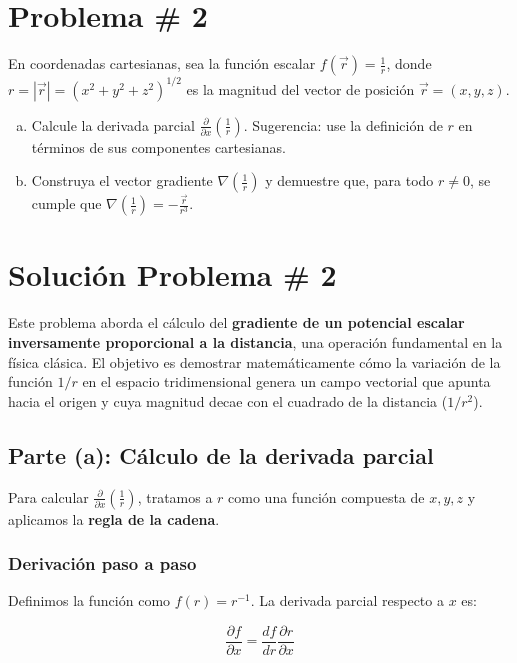 \documentclass[a4paper]{article}
\begin{document}
\section{Problema \# 2}

En coordenadas cartesianas, sea la función escalar $f(\vec{r}) = \frac{1}{r}$, donde $r = |\vec{r}| = (x^2 + y^2 + z^2)^{1/2}$ es la magnitud del vector de posición $\vec{r} = (x, y, z)$.

\begin{enumerate}[a)]
    \item Calcule la derivada parcial $\frac{\partial}{\partial x} \left( \frac{1}{r} \right)$. Sugerencia: use la definición de $r$ en términos de sus componentes cartesianas.
    \item Construya el vector gradiente $\nabla \left( \frac{1}{r} \right)$ y demuestre que, para todo $r \neq 0$, se cumple que $\nabla \left( \frac{1}{r} \right) = -\frac{\vec{r}}{r^3}$.
\end{enumerate}

\section*{Solución Problema \# 2}

Este problema aborda el cálculo del \textbf{gradiente de un potencial escalar inversamente proporcional a la distancia}, una operación fundamental en la física clásica. El objetivo es demostrar matemáticamente cómo la variación de la función $1/r$ en el espacio tridimensional genera un campo vectorial que apunta hacia el origen y cuya magnitud decae con el cuadrado de la distancia ($1/r^2$).

\subsection{Parte (a): Cálculo de la derivada parcial}

Para calcular $\frac{\partial}{\partial x} \left( \frac{1}{r} \right)$, tratamos a $r$ como una función compuesta de $x, y, z$ y aplicamos la \textbf{regla de la cadena}.

\subsubsection{Derivación paso a paso}

Definimos la función como $f(r) = r^{-1}$. La derivada parcial respecto a $x$ es:

$$ \frac{\partial f}{\partial x} = \frac{df}{dr} \frac{\partial r}{\partial x} $$
\end{document}
